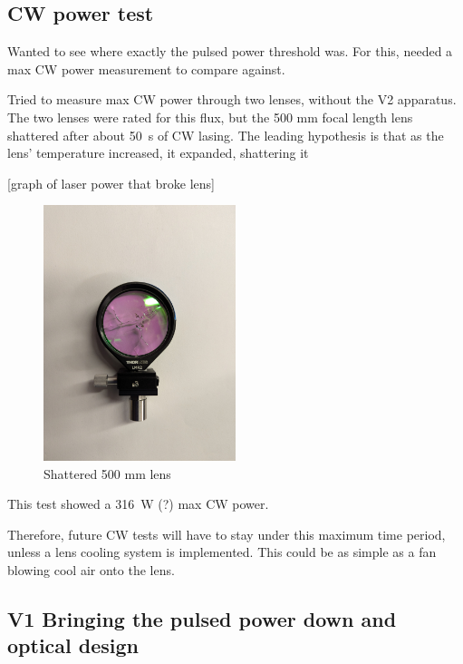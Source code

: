         \subsection{CW power test}

        Wanted to see where exactly the pulsed power threshold was. For this, needed a max CW power measurement to compare against. 

        Tried to measure max CW power through two lenses, without the V2 apparatus. The two lenses were rated for this flux, but the 500 mm focal length lens shattered after about \qty{50}{s} of CW lasing. The leading hypothesis is that as the lens' temperature increased, it expanded, shattering it

        [graph of laser power that broke lens]

        \begin{figure}[!ht]
            \centering
            \includegraphics[width=0.5\textwidth]{assets/4 experiments/Shattered 500 mm lens.jpg}
            \caption{Shattered 500 mm lens}
        \end{figure}

        This test showed a \qty{316}{W} (?) max CW power.

        Therefore, future CW tests will have to stay under this maximum time period, unless a lens cooling system is implemented. This could be as simple as a fan blowing cool air onto the lens.

    \subsection{V1 Bringing the pulsed power down and optical design} \label{sec:pulse_power_down_V1}

